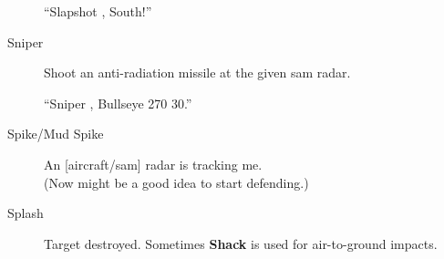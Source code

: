 \begin{description}
    ``Slapshot , South!''

\item[Sniper] Shoot an anti-radiation missile at the given \ac{sam} radar.

    ``Sniper , Bullseye 270 30.''

\item[Spike/Mud Spike] An [aircraft/\ac{sam}] radar is tracking me. \\
    (Now might be a good idea to start defending.)

\item[Splash] Target destroyed. Sometimes \textbf{Shack} is used for
    air-to-ground impacts.

\end{description}
